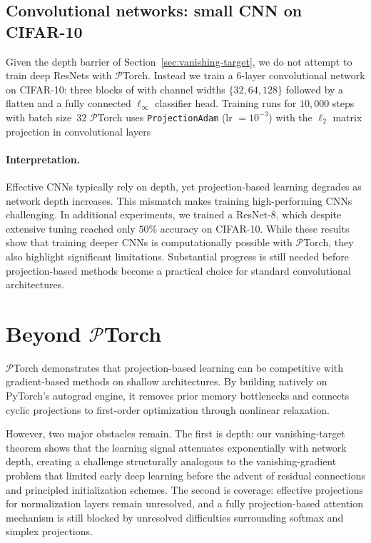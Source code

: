 \documentclass{article}
\begin{document}
\subsection{Convolutional networks: small CNN on CIFAR-10}
\label{sec:exp-cnn}
\begin{tcolorbox}[reprocard, title=Setup]
Given the depth barrier of Section~\ref{sec:vanishing-target}, we do
not attempt to train deep ResNets with $\mathcal{P}$Torch. Instead we
train a 6-layer convolutional network on CIFAR-10: three blocks of with channel widths $\{32, 64, 128\}$  followed by a flatten and a fully connected $\ell_\infty$ classifier head. Training runs for $10{,}000$ steps with batch size~$32$  $\mathcal{P}$Torch uses \texttt{ProjectionAdam} (lr $=10^{-3}$) with the $\ell_2$ matrix projection in convolutional layers
\end{tcolorbox}

\paragraph{Interpretation.}
Effective CNNs typically rely on depth, yet projection-based learning degrades as network depth increases. This mismatch makes training high-performing CNNs challenging. In additional experiments, we trained a ResNet-8, which despite extensive tuning reached only $50\%$ accuracy on CIFAR-10. While these results show that training deeper CNNs is computationally possible with $\mathcal{P}$Torch, they also highlight significant limitations. Substantial progress is still needed before projection-based methods become a practical choice for standard convolutional architectures. 

\section{Beyond $\mathcal{P}$Torch}
$\mathcal{P}$Torch demonstrates that projection-based learning can be competitive with gradient-based methods on shallow architectures. By building natively on PyTorch's autograd engine, it removes prior memory bottlenecks and connects cyclic projections to first-order optimization through nonlinear relaxation.

However, two major obstacles remain. The first is depth: our vanishing-target theorem shows that the learning signal attenuates exponentially with network depth, creating a challenge structurally analogous to the vanishing-gradient problem that limited early deep learning before the advent of residual connections and principled initialization schemes. The second is coverage: effective projections for normalization layers remain unresolved, and a fully projection-based attention mechanism is still blocked by unresolved difficulties surrounding softmax and simplex projections.
\end{document}
